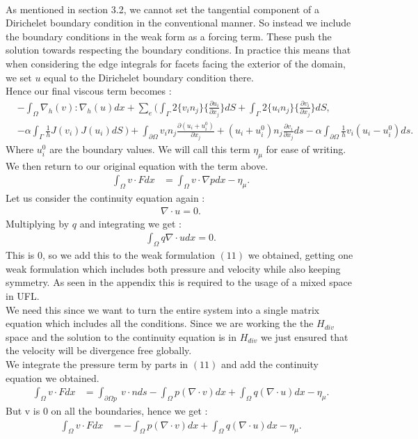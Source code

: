 \documentclass[11pt,twoside,a4paper]{article}
\begin{document}
\\
As mentioned in section 3.2, we cannot set the tangential component of a Dirichelet boundary condition in the conventional manner.  So instead we include the boundary conditions in the weak form as a forcing term. These push the solution towards respecting the boundary conditions. In practice this means that when considering the edge integrals for facets facing the exterior of the domain, we set $u$ equal to the Dirichelet boundary condition there.\\
 Hence our final viscous term becomes :\\
\begin{align*}
&-  \int_\Omega \nabla_h(v) : \nabla_h(u) dx + \sum_e ( \int_\Gamma 2 \{ v_i n_j \} \{ \frac{\partial u_i}{\partial x_j}\} dS + \int_\Gamma 2 \{ u_i n_j \} \{ \frac{\partial v_i}{\partial x_j}\} dS, \\
&- \alpha \int_\Gamma \frac{1}{h}  J(v_i) J(u_i) dS \ ) + \int_{\partial  \Omega} v_i n_j \frac{\partial(u_i + u^0_i)}{\partial x_j} + (u_i + u^0_i) n_j\frac{\partial v_i}{\partial x_j} ds - \alpha \int_{\partial \Omega} \frac{1}{h} v_i(u_i-u^0_i)ds .
\end{align*}
Where $u^0_i$ are the boundary values.
We will call this term $\eta_\mu$ for ease of writing.\\
We then return to our original equation with the term above.
\begin{align}
\int_\Omega v \cdot F dx &= \int_\Omega v \cdot \nabla p dx - \eta_\mu .
\end{align}
Let us consider the continuity equation again :
\begin{align*}
\nabla \cdot u = 0 .
\end{align*}
Multiplying by $q$ and integrating we get :
\begin{align*}
\int_\Omega q \nabla \cdot u dx = 0 .
\end{align*}
This is $0$, so we add this to the weak formulation $(11)$ we obtained, getting one weak formulation which includes both pressure and velocity while also keeping symmetry. As seen in the appendix this is required to the usage of a mixed space in UFL.\\
We need this since we want to turn the entire system into a single matrix equation which includes all the conditions. Since we are working the the $H_{div}$ space and the solution to the continuity equation is in $H_{div}$ we just ensured that the velocity will be divergence free globally.\\
We integrate the pressure term by parts in $(11)$ and add the continuity equation we obtained.
\begin{align}
\int_\Omega v \cdot F dx &= \int_{\partial \Omega p} \ v \cdot n ds - \int_\Omega  p ( \nabla \cdot v) dx + \int_\Omega q (\nabla \cdot u) dx  - \eta_\mu .
\end{align}
But v is $0$ on all the boundaries, hence we get :
\begin{align}
\int_\Omega v \cdot F dx &= - \int_\Omega  p ( \nabla \cdot v) dx + \int_\Omega q (\nabla \cdot u) dx  - \eta_\mu .
\end{align}
\end{document}
